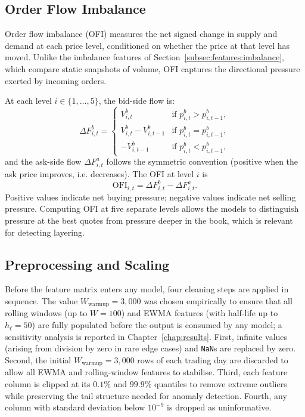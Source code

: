\documentclass[11pt]{report}
\begin{document}
\subsection{Order Flow Imbalance}\label{subsec:features:ofi}

Order flow imbalance (OFI) measures the net signed change in supply and demand at each price level, conditioned on whether the price at that level has moved. Unlike the imbalance features of Section~\ref{subsec:features:imbalance}, which compare static snapshots of volume, OFI captures the directional pressure exerted by incoming orders.

At each level $i \in \{1, \ldots, 5\}$, the bid-side flow is:
\begin{equation}
  \label{eq:ofi_bid}
  \Delta F^b_{i,t} =
  \begin{cases}
    V^b_{i,t}               & \text{if } p^b_{i,t} > p^b_{i,t-1}, \\
    V^b_{i,t} - V^b_{i,t-1} & \text{if } p^b_{i,t} = p^b_{i,t-1}, \\
    -V^b_{i,t-1}            & \text{if } p^b_{i,t} < p^b_{i,t-1},
  \end{cases}
\end{equation}
and the ask-side flow $\Delta F^a_{i,t}$ follows the symmetric convention (positive when the ask price improves, i.e. decreases).
The OFI at level $i$ is
\begin{equation}
  \label{eq:ofi}
  \text{OFI}_{i,t} = \Delta F^b_{i,t} - \Delta F^a_{i,t}.
\end{equation}
Positive values indicate net buying pressure; negative values indicate net selling pressure. Computing OFI at five separate levels allows the models to distinguish pressure at the best quotes from pressure deeper in the book, which is relevant for detecting layering.


\subsection{Preprocessing and Scaling}\label{subsec:features:preprocessing}

Before the feature matrix enters any model, four cleaning steps are applied in sequence. The value $W_{\text{warmup}} = 3{,}000$ was chosen empirically to ensure that all rolling windows (up to $W = 100$) and EWMA features (with half-life up to $h_\ell = 50$) are fully populated before the output is consumed by any model; a sensitivity analysis is reported in Chapter~\ref{chap:results}. First, infinite values (arising from division by zero in rare edge cases) and \texttt{NaN}s are replaced by zero. Second, the initial $W_{\text{warmup}} = 3{,}000$ rows of each trading day are discarded to allow all EWMA and rolling-window features to stabilise. Third, each feature column is clipped at its $0.1\%$ and $99.9\%$ quantiles to remove extreme outliers while preserving the tail structure needed for anomaly detection.
Fourth, any column with standard deviation below $10^{-9}$ is dropped as uninformative.
\end{document}
